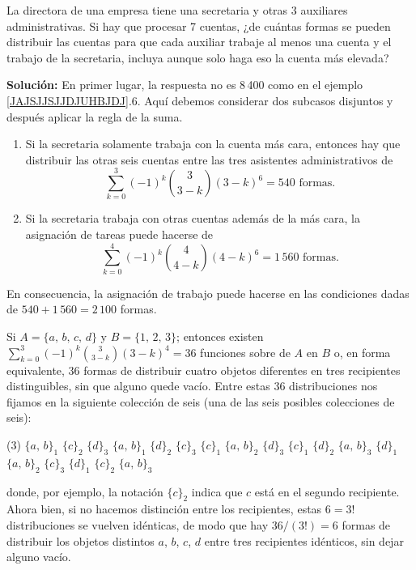 \begin{myexample}
    La directora de una empresa tiene una secretaria y otras 3 auxiliares administrativas. Si hay que procesar 7 cuentas, ¿de cuántas formas se pueden distribuir las cuentas para que cada auxiliar trabaje al menos una cuenta y el trabajo de la secretaria, incluya aunque solo haga eso la cuenta más elevada?

    \tcblower
    \textbf{\color{jblueleft}Solución:} En primer lugar, la respuesta no es 8\,400 como en el ejemplo \ref{JAJSJJSJJDJUHBJDJ}.6. Aquí debemos considerar dos subcasos disjuntos y después aplicar la regla de la suma.
    \begin{enumerate}[label=\alph*)]
        \item Si la secretaria solamente trabaja con la cuenta más cara, entonces hay que distribuir las otras seis cuentas entre las tres asistentes administrativos de
        $$\sum_{k=0}^3 (-1)^k \binom{3}{3-k} (3-k)^6= 540 \text{ formas.}$$
        \item Si la secretaria trabaja con otras cuentas además de la más cara, la asignación de tareas puede hacerse de
        $$\sum_{k=0}^4 (-1)^k \binom{4}{4-k} (4-k)^6= 1\, 560 \text{ formas.}$$
    \end{enumerate}
    En consecuencia, la asignación de trabajo puede hacerse en las condiciones dadas de $540 + 1\, 560 = 2\, 100$ formas.
\end{myexample}

\begin{myexample}
    Si $A = \{a, \, b, \, c, \, d\}$ y $B = \{1, \, 2, \, 3\}$; entonces existen $\displaystyle \sum_{k=0}^3 (-1)^k \binom{3}{3-k} (3-k)^4 = 36$ funciones sobre de $A$ en $B$ o, en forma equivalente, 36 formas de distribuir cuatro objetos diferentes en tres recipientes distinguibles, sin que alguno quede vacío. Entre estas 36 distribuciones nos fijamos en la siguiente colección de seis (una de las seis posibles colecciones de seis):
    \begin{tasks}[style=enumerate](3)
        \task $\{ a, \, b \}_1$ \quad $\{ c \}_2$ \quad $\{ d \}_3$
        \task $\{ a, \, b \}_1$ \quad $\{ d \}_2$ \quad $\{ c \}_3$
        \task $\{ c \}_1$ \quad $\{ a, \, b \}_2$ \quad $\{ d \}_3$
        \task $\{ c \}_1$ \quad $\{ d \}_2$ \quad $\{ a, \, b \}_3$
        \task $\{ d \}_1$ \quad $\{ a, \, b \}_2$ \quad $\{ c \}_3$
        \task $\{ d \}_1$ \quad $\{ c \}_2$ \quad $\{ a, \, b \}_3$
    \end{tasks}
    donde, por ejemplo, la notación $\{ c \}_2$ indica que $c$ está en el segundo recipiente. Ahora bien, si no hacemos distinción entre los recipientes, estas $6 = 3!$ distribuciones se vuelven idénticas, de modo que hay $36/(3!) = 6$ formas de distribuir los objetos distintos $a$, $b$, $c$, $d$ entre tres recipientes idénticos, sin dejar alguno vacío.
\end{myexample}

